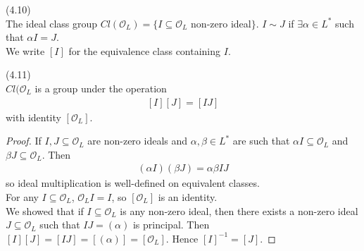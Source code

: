 \documentclass[a4paper]{article}
\begin{document}
\begin{defi} (4.10)\\
The ideal class group $Cl(\mathcal{O}_L) = \{I\subseteq \mathcal{O}_L$ non-zero ideal$\}$. $I \sim J$ if $\exists \alpha \in L^*$ such that $\alpha I = J$.\\
We write $[I]$ for the equivalence class containing $I$.
\end{defi}

\begin{lemma} (4.11)\\
$Cl(\mathcal{O}_L$ is a group under the operation
\begin{equation*}
\begin{aligned}
[I][J] = [IJ]
\end{aligned}
\end{equation*}
with identity $[\mathcal{O}_L]$.
\begin{proof}
If $I,J \subseteq \mathcal{O}_L$ are non-zero ideals and $\alpha,\beta \in L^*$ are such that $\alpha I \subseteq \mathcal{O}_L$ and $\beta J \subseteq \mathcal{O}_L$. Then
\begin{equation*}
\begin{aligned}
(\alpha I)(\beta J) = \alpha\beta IJ
\end{aligned}
\end{equation*}
so ideal multiplication is well-defined on equivalent classes.\\
For any $I \subseteq \mathcal{O}_L$, $\mathcal{O}_L I = I$, so $[\mathcal{O}_L]$ is an identity.\\
We showed that if $I \subseteq \mathcal{O}_L$ is any non-zero ideal, then there exists a non-zero ideal $J \subseteq \mathcal{O}_L$ such that $IJ = (\alpha)$ is principal. Then $[I][J] = [IJ] = [(\alpha)] = [\mathcal{O}_L]$. Hence $[I]^{-1} = [J]$.
\end{proof}
\end{lemma}
\end{document}
